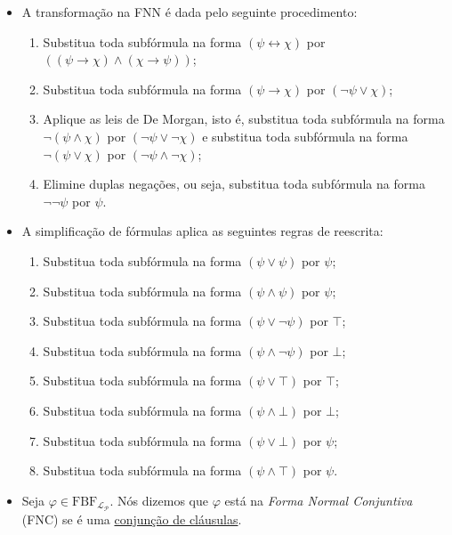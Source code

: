 \begin{itemize}[left=0.5cm, align=left, nosep]
            \item A transformação na FNN é dada pelo seguinte procedimento:
            \begin{enumerate}[left=0.5cm, align=left, nosep]
                \item Substitua toda subfórmula na forma $(\psi \leftrightarrow \chi)$ por $((\psi \rightarrow \chi) \wedge 
                (\chi \rightarrow \psi))$;
                \item Substitua toda subfórmula na forma $(\psi \rightarrow \chi)$ por $(\neg\psi \vee \chi)$;
                \item Aplique as leis de De Morgan, isto é, substitua toda subfórmula na forma $\neg(\psi \wedge \chi)$ por 
                $(\neg\psi \vee \neg\chi)$ e substitua toda subfórmula na forma $\neg(\psi \vee \chi)$ por $(\neg\psi \wedge \neg\chi)$;
                \item Elimine duplas negações, ou seja, substitua toda subfórmula na forma $\neg\neg\psi$ por $\psi$.
            \end{enumerate}

            \item A simplificação de fórmulas aplica as seguintes regras de reescrita:
            \begin{enumerate}[left=0.5cm, align=left, nosep]
                \item Substitua toda subfórmula na forma $(\psi \vee \psi)$ por $\psi$;
                \item Substitua toda subfórmula na forma $(\psi \wedge \psi)$ por $\psi$;
                \item Substitua toda subfórmula na forma $(\psi \vee \neg\psi)$ por $\top$;
                \item Substitua toda subfórmula na forma $(\psi \wedge \neg\psi)$ por $\bot$;
                \item Substitua toda subfórmula na forma $(\psi \vee \top)$ por $\top$;
                \item Substitua toda subfórmula na forma $(\psi \wedge \bot)$ por $\bot$;
                \item Substitua toda subfórmula na forma $(\psi \vee \bot)$ por $\psi$;
                \item Substitua toda subfórmula na forma $(\psi \wedge \top)$ por $\psi$.
            \end{enumerate}

            \item Seja $\varphi \in \text{FBF}_{\mathcal{L_P}}$. Nós dizemos que $\varphi$ está na \textit{Forma Normal Conjuntiva} 
            (FNC) se é uma \underline{conjunção de cláusulas}.


\end{itemize}
